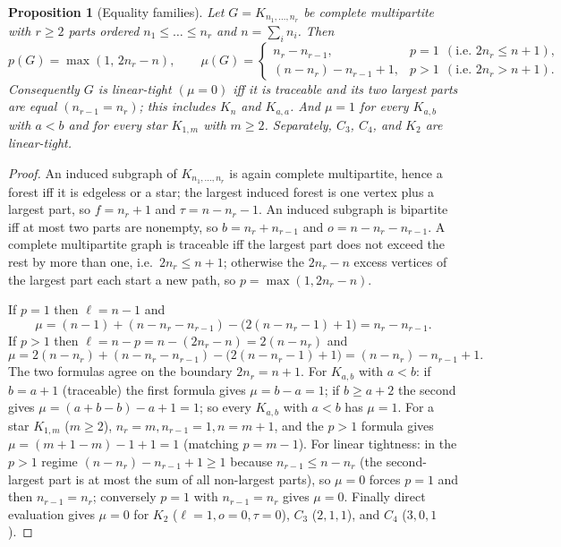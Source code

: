 \documentclass[11pt]{article}
\theoremstyle{plain}
\newtheorem{proposition}[theorem]{Proposition}
\theoremstyle{definition}
\newcommand{\FVS}{\tau}
\newcommand{\OCT}{o}
\newcommand{\lf}{\ell}
\begin{document}
\begin{proposition}[Equality families]\label{prop:equality}
Let $G=K_{n_1,\dots,n_r}$ be complete multipartite with $r\ge2$ parts ordered
$n_1\le\dots\le n_r$ and $n=\sum_i n_i$. Then
\[
p(G)=\max(1,\,2n_r-n),\qquad
\mu(G)=
\begin{cases}
n_r-n_{r-1}, & p=1\ \ (\text{i.e. } 2n_r\le n+1),\\[2pt]
(n-n_r)-n_{r-1}+1, & p>1\ \ (\text{i.e. } 2n_r> n+1).
\end{cases}
\]
Consequently $G$ is linear-tight $(\mu=0)$ iff it is traceable and its two
largest parts are equal $(n_{r-1}=n_r)$; this includes $K_n$ and $K_{a,a}$. And
$\mu=1$ for every $K_{a,b}$ with $a<b$ and for every star $K_{1,m}$ with $m\ge2$.
Separately, $C_3$, $C_4$, and $K_2$ are linear-tight.
\end{proposition}

\begin{proof}
An induced subgraph of $K_{n_1,\dots,n_r}$ is again complete multipartite, hence
a forest iff it is edgeless or a star; the largest induced forest is one vertex
plus a largest part, so $f=n_r+1$ and $\FVS=n-n_r-1$. An induced subgraph is
bipartite iff at most two parts are nonempty, so $b=n_r+n_{r-1}$ and
$\OCT=n-n_r-n_{r-1}$. A complete multipartite graph is traceable iff the largest
part does not exceed the rest by more than one, i.e.\ $2n_r\le n+1$; otherwise the
$2n_r-n$ excess vertices of the largest part each start a new path, so
$p=\max(1,2n_r-n)$.

If $p=1$ then $\lf=n-1$ and
\[
\mu=(n-1)+(n-n_r-n_{r-1})-\bigl(2(n-n_r-1)+1\bigr)=n_r-n_{r-1}.
\]
If $p>1$ then $\lf=n-p=n-(2n_r-n)=2(n-n_r)$ and
\[
\mu=2(n-n_r)+(n-n_r-n_{r-1})-\bigl(2(n-n_r-1)+1\bigr)=(n-n_r)-n_{r-1}+1.
\]
The two formulas agree on the boundary $2n_r=n+1$. For $K_{a,b}$ with $a<b$: if
$b=a+1$ (traceable) the first formula gives $\mu=b-a=1$; if $b\ge a+2$ the second
gives $\mu=(a+b-b)-a+1=1$; so every $K_{a,b}$ with $a<b$ has $\mu=1$. For a star
$K_{1,m}$ ($m\ge2$), $n_r=m,n_{r-1}=1,n=m+1$, and the $p>1$ formula gives
$\mu=(m+1-m)-1+1=1$ (matching $p=m-1$). For linear tightness: in the $p>1$ regime
$(n-n_r)-n_{r-1}+1\ge1$ because $n_{r-1}\le n-n_r$ (the second-largest part is at
most the sum of all non-largest parts), so $\mu=0$ forces $p=1$ and then
$n_{r-1}=n_r$; conversely $p=1$ with $n_{r-1}=n_r$ gives $\mu=0$. Finally direct
evaluation gives $\mu=0$ for $K_2$ ($\lf=1,\OCT=0,\FVS=0$), $C_3$ ($2,1,1$), and
$C_4$ ($3,0,1$).
\end{proof}
\end{document}
